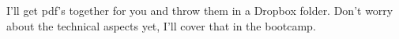 \documentclass[11pt,letterpaper]{article} %
\begin{document}
I'll get pdf's together for you and throw them in a Dropbox folder.  Don't worry about the technical aspects yet, I'll cover that in the bootcamp. 





\setlength{\bibsep}{0.00cm plus 0.05cm} %


\end{document}
